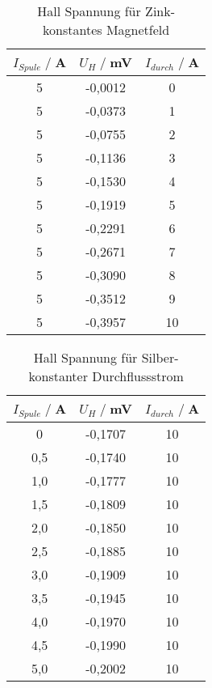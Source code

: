 \begin{table}
    \centering
    \begin{tabular}{c c c}
        \toprule
        $I_{Spule} \;/\;$A & $U_H\;/\;$mV & $I_{durch} \;/\;$A\\
        \midrule
            5                   &-0,0012&             0\\
            5                   &-0,0373&             1\\
            5                   &-0,0755&             2\\
            5                   &-0,1136&             3\\
            5                   &-0,1530&             4\\
            5                   &-0,1919&             5\\
            5                   &-0,2291&             6\\
            5                   &-0,2671&             7\\
            5                   &-0,3090&             8\\
            5                   &-0,3512&             9\\
            5                   &-0,3957&             10\\
        \bottomrule
    \end{tabular}
    \caption{Hall Spannung für Zink- konstantes Magnetfeld}
    \label{tab:Zn_B}
\end{table}

\begin{table}
    \centering
    \begin{tabular}{c c c}
        \toprule
        $I_{Spule} \;/\;$A & $U_H\;/\;$mV & $I_{durch} \;/\;$A\\
        \midrule
            0                   &-0,1707&             10\\
            0,5                 &-0,1740&             10\\
            1,0                 &-0,1777&             10\\
            1,5                 &-0,1809&             10\\
            2,0                 &-0,1850&             10\\
            2,5                 &-0,1885&             10\\
            3,0                 &-0,1909&             10\\
            3,5                 &-0,1945&             10\\
            4,0                 &-0,1970&             10\\
            4,5                 &-0,1990&             10\\
            5,0                 &-0,2002&             10\\
       \bottomrule
    \end{tabular}
    \caption{Hall Spannung für Silber- konstanter Durchflussstrom}
    \label{tab:Ag_I}
\end{table}

